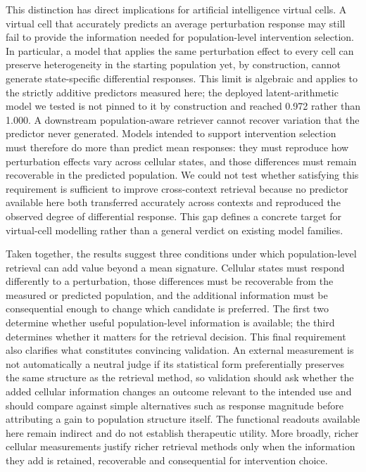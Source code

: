 \documentclass[11pt,letterpaper]{article}
\begin{document}
This distinction has direct implications for artificial intelligence virtual cells\cite{AIVirtualCell,VirtualCellChallenge}. A virtual cell that accurately predicts an average perturbation response may still fail to provide the information needed for population-level intervention selection. In particular, a model that applies the same perturbation effect to every cell can preserve heterogeneity in the starting population yet, by construction, cannot generate state-specific differential responses. This limit is algebraic and applies to the strictly additive predictors measured here; the deployed latent-arithmetic model we tested\cite{ref4} is not pinned to it by construction and reached 0.972 rather than 1.000. A downstream population-aware retriever cannot recover variation that the predictor never generated. Models intended to support intervention selection must therefore do more than predict mean responses: they must reproduce how perturbation effects vary across cellular states, and those differences must remain recoverable in the predicted population. We could not test whether satisfying this requirement is sufficient to improve cross-context retrieval because no predictor available here both transferred accurately across contexts and reproduced the observed degree of differential response. This gap defines a concrete target for virtual-cell modelling rather than a general verdict on existing model families.

Taken together, the results suggest three conditions under which population-level retrieval can add value beyond a mean signature. Cellular states must respond differently to a perturbation, those differences must be recoverable from the measured or predicted population, and the additional information must be consequential enough to change which candidate is preferred. The first two determine whether useful population-level information is available; the third determines whether it matters for the retrieval decision. This final requirement also clarifies what constitutes convincing validation. An external measurement is not automatically a neutral judge if its statistical form preferentially preserves the same structure as the retrieval method\cite{ref17,MetricGaming}, so validation should ask whether the added cellular information changes an outcome relevant to the intended use and should compare against simple alternatives such as response magnitude\cite{ref13} before attributing a gain to population structure itself. The functional readouts available here remain indirect and do not establish therapeutic utility. More broadly, richer cellular measurements justify richer retrieval methods only when the information they add is retained, recoverable and consequential for intervention choice.
\end{document}
